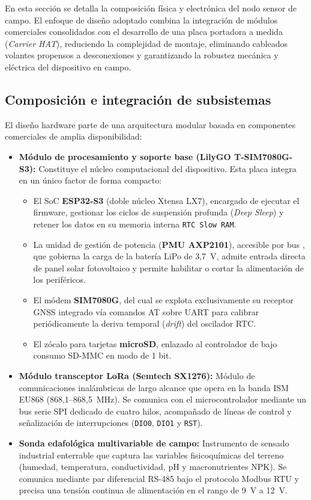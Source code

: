 En esta sección se detalla la composición física y electrónica del nodo sensor de campo. El enfoque de diseño adoptado combina la integración de módulos comerciales consolidados con el desarrollo de una placa portadora a medida (\textit{Carrier HAT}), reduciendo la complejidad de montaje, eliminando cableados volantes propensos a desconexiones y garantizando la robustez mecánica y eléctrica del dispositivo en campo.

\subsection{Composición e integración de subsistemas}
El diseño hardware parte de una arquitectura modular basada en componentes comerciales de amplia disponibilidad:

\begin{itemize}
    \item \textbf{Módulo de procesamiento y soporte base (LilyGO T-SIM7080G-S3):} Constituye el núcleo computacional del dispositivo. Esta placa integra en un único factor de forma compacto:
    \begin{itemize}
        \item El SoC \textbf{ESP32-S3} (doble núcleo Xtensa LX7), encargado de ejecutar el firmware, gestionar los ciclos de suspensión profunda (\textit{Deep Sleep}) y retener los datos en su memoria interna \texttt{RTC Slow RAM}.
        \item La unidad de gestión de potencia (\textbf{PMU AXP2101}), accesible por bus , que gobierna la carga de la batería LiPo de 3,7~V, admite entrada directa de panel solar fotovoltaico y permite habilitar o cortar la alimentación de los periféricos.
        \item El módem \textbf{SIM7080G}, del cual se explota exclusivamente su receptor GNSS integrado vía comandos AT sobre UART para calibrar periódicamente la deriva temporal (\textit{drift}) del oscilador RTC.
        \item El zócalo para tarjetas \textbf{microSD}, enlazado al controlador de bajo consumo SD-MMC en modo de 1 bit.
    \end{itemize}
    \item \textbf{Módulo transceptor LoRa (Semtech SX1276):} Módulo de comunicaciones inalámbricas de largo alcance que opera en la banda ISM EU868 (868,1--868,5~MHz). Se comunica con el microcontrolador mediante un bus serie SPI dedicado de cuatro hilos, acompañado de líneas de control y señalización de interrupciones (\texttt{DIO0}, \texttt{DIO1} y \texttt{RST}).
    \item \textbf{Sonda edafológica multivariable de campo:} Instrumento de sensado industrial enterrable que captura las variables fisicoquímicas del terreno (humedad, temperatura, conductividad, pH y macronutrientes NPK). Se comunica mediante par diferencial RS-485 bajo el protocolo Modbus RTU y precisa una tensión continua de alimentación en el rango de 9~V a 12~V.
\end{itemize}

